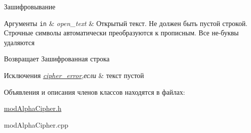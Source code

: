 Зашифровывание 


\begin{DoxyParams}[1]{Аргументы}
\mbox{\tt in}  & {\em open\+\_\+text} & Открытый текст. Не должен быть пустой строкой. Строчные символы автоматически преобразуются к прописным. Все не-\/буквы удаляются \\
\hline
\end{DoxyParams}
\begin{DoxyReturn}{Возвращает}
Зашифрованная строка 
\end{DoxyReturn}

\begin{DoxyExceptions}{Исключения}
{\em \hyperlink{classcipher__error}{cipher\+\_\+error},если} & текст пустой \\
\hline
\end{DoxyExceptions}


Объявления и описания членов классов находятся в файлах\+:\begin{DoxyCompactItemize}
\item 
\hyperlink{modAlphaCipher_8h}{mod\+Alpha\+Cipher.\+h}\item 
mod\+Alpha\+Cipher.\+cpp\end{DoxyCompactItemize}

